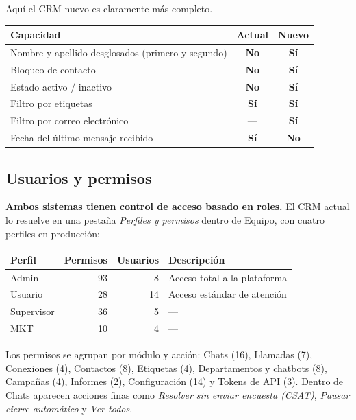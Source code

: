 \documentclass[11pt,a4paper]{article}
\newcommand{\si}{\textcolor{ok}{\textbf{Sí}}}
\newcommand{\no}{\textcolor{warn}{\textbf{No}}}
\begin{document}
Aquí el CRM nuevo es claramente más completo.

\begin{center}
\begin{tabularx}{\textwidth}{@{}Lcc@{}}
\toprule
\textbf{Capacidad} & \textbf{Actual} & \textbf{Nuevo} \\
\midrule
Nombre y apellido desglosados (primero y segundo) & \no & \si \\
Bloqueo de contacto                               & \no & \si \\
Estado activo / inactivo                          & \no & \si \\
Filtro por etiquetas                              & \si & \si \\
Filtro por correo electrónico                     & --- & \si \\
Fecha del último mensaje recibido                 & \si & \no \\
\bottomrule
\end{tabularx}
\end{center}

\subsection{Usuarios y permisos}

\textbf{Ambos sistemas tienen control de acceso basado en roles.} El CRM actual lo
resuelve en una pestaña \emph{Perfiles y permisos} dentro de Equipo, con cuatro
perfiles en producción:

\begin{center}
\begin{tabular}{@{}lrrl@{}}
\toprule
\textbf{Perfil} & \textbf{Permisos} & \textbf{Usuarios} & \textbf{Descripción} \\
\midrule
Admin      & 93 & 8  & Acceso total a la plataforma \\
Usuario    & 28 & 14 & Acceso estándar de atención \\
Supervisor & 36 & 5  & --- \\
MKT        & 10 & 4  & --- \\
\bottomrule
\end{tabular}
\end{center}

Los permisos se agrupan por módulo y acción: Chats (16), Llamadas (7), Conexiones (4),
Contactos (8), Etiquetas (4), Departamentos y chatbots (8), Campañas (4), Informes (2),
Configuración (14) y Tokens de API (3). Dentro de Chats aparecen acciones finas como
\emph{Resolver sin enviar encuesta (CSAT)}, \emph{Pausar cierre automático} y
\emph{Ver todos}.
\end{document}
